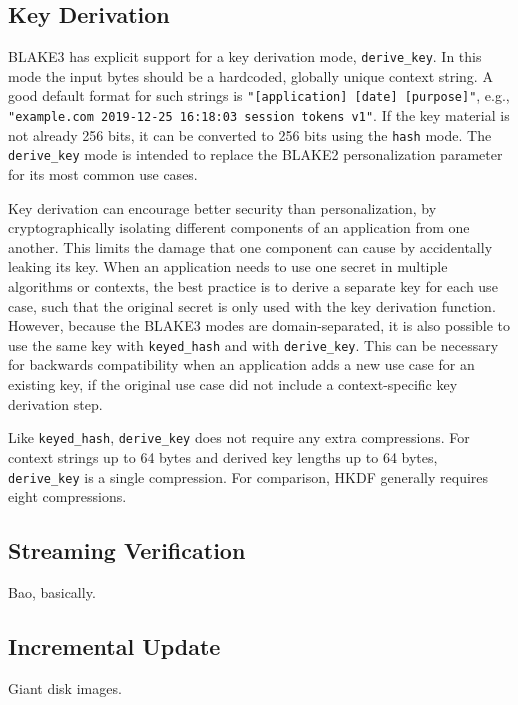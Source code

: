 \documentclass[11pt,notitlepage,a4paper]{article}
\begin{document}
\subsection{Key Derivation}\label{sec:kdf}

BLAKE3 has explicit support for a key derivation mode, \texttt{derive\_key}. In
this mode the input bytes should be a hardcoded, globally unique context
string. A good default format for such strings is \texttt{"[application] [date]
[purpose]"}, e.g., \texttt{"example.com 2019-12-25 16:18:03 session tokens
v1"}. If the key material is not already 256 bits, it can be converted to 256
bits using the \texttt{hash} mode. The \texttt{derive\_key} mode is intended to
replace the BLAKE2 personalization parameter for its most common use cases.

Key derivation can encourage better security than personalization, by
cryptographically isolating different components of an application from one
another. This limits the damage that one component can cause by accidentally
leaking its key. When an application needs to use one secret in multiple
algorithms or contexts, the best practice is to derive a separate key for each
use case, such that the original secret is only used with the key derivation
function. However, because the BLAKE3 modes are domain-separated, it is also
possible to use the same key with \texttt{keyed\_hash} and with
\texttt{derive\_key}. This can be necessary for backwards compatibility when an
application adds a new use case for an existing key, if the original use case
did not include a context-specific key derivation step.

Like \texttt{keyed\_hash}, \texttt{derive\_key} does not require any extra
compressions. For context strings up to 64 bytes and derived key lengths up to
64 bytes, \texttt{derive\_key} is a single compression. For comparison, HKDF
generally requires eight compressions.

\subsection{Streaming Verification}\label{sec:streamingverification}

Bao, basically.

\subsection{Incremental Update}\label{sec:incrementalupdate}

Giant disk images.
\end{document}
